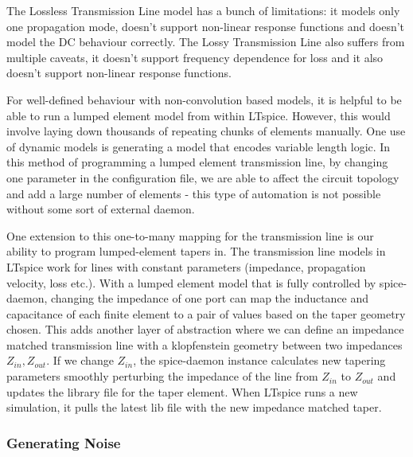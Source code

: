 \documentclass{article}
\begin{document}
The Lossless Transmission Line model has a bunch of limitations: it models only one propagation mode,
 doesn't support non-linear response functions and doesn't 
model the DC behaviour correctly. The Lossy Transmission Line also suffers from multiple caveats,
it doesn't support frequency dependence for loss and it also doesn't support non-linear response 
functions. %

For well-defined behaviour with non-convolution based models, it is helpful to be able to run
a lumped element model from within LTspice. However, this would involve laying down thousands 
of repeating chunks of elements manually. One use of dynamic models is generating a model 
that encodes variable length logic. In this method of programming a lumped element transmission
line, by changing one parameter in the configuration file, we are able to affect the circuit
topology and add a large number of elements - this type of automation is not possible without
some sort of external daemon.

One extension to this one-to-many mapping for the transmission line is our ability to program
lumped-element tapers in. The transmission line models in LTspice work for lines with constant 
parameters (impedance, propagation velocity, loss etc.). With a lumped element model that is fully
controlled by spice-daemon, changing the impedance of one port can map the inductance and capacitance
of each finite element to a pair of values based on the taper geometry chosen. This adds another layer
of abstraction where we can define an impedance matched transmission line with a klopfenstein geometry
between two impedances $Z_{in}, Z_{out}$. If we change $Z_{in}$, the spice-daemon instance calculates
new tapering parameters smoothly perturbing the impedance of the line from $Z_{in}$ to $Z_{out}$ and
updates the library file for the taper element. When LTspice runs a new simulation, it pulls the latest
lib file with the new impedance matched taper.

\subsubsection{Generating Noise}

\end{document}

